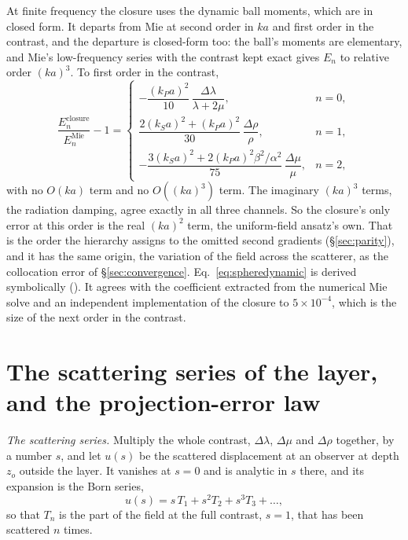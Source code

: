 \documentclass[preprint,review,12pt]{elsarticle}
\begin{document}
At finite frequency the closure uses the dynamic ball moments, which are in closed form. It
departs from Mie at second order in $ka$ and first order in the contrast, and the departure is
closed-form too: the ball's moments are elementary, and Mie's low-frequency series with the
contrast kept exact gives $E_n$ to relative order $(ka)^3$. To first order in the contrast,
\begin{equation}\label{eq:spheredynamic}
\frac{E_n^{\text{closure}}}{E_n^{\text{Mie}}}-1=
\begin{cases}
  -\dfrac{(k_Pa)^2}{10}\,\dfrac{\Delta\lambda}{\lambda+2\mu}, & n=0,\\[8pt]
  \dfrac{2(k_Sa)^2+(k_Pa)^2}{30}\,\dfrac{\Delta\rho}{\rho}, & n=1,\\[8pt]
  -\dfrac{3(k_Sa)^2+2(k_Pa)^2\beta^2/\alpha^2}{75}\,\dfrac{\Delta\mu}{\mu}, & n=2,
\end{cases}
\end{equation}
with no $O(ka)$ term and no $O((ka)^3)$ term. The imaginary $(ka)^3$ terms, the radiation damping,
agree exactly in all three channels. So the closure's only error at this order is the real
$(ka)^2$ term, the uniform-field ansatz's own. That is the order the hierarchy assigns to the
omitted second gradients (\S\ref{sec:parity}), and it has the same origin, the variation of the
field across the scatterer, as the collocation error of \S\ref{sec:convergence}. Eq.~\eqref{eq:spheredynamic} is derived symbolically
(). It agrees with the coefficient extracted from the numerical Mie
solve and an independent implementation of the closure to $5\times10^{-4}$, which is the size of the
next order in the contrast.

\FloatBarrier

\section{The scattering series of the layer, and the projection-error law}\label{app:borndefect}

\emph{The scattering series.} Multiply the whole contrast, $\Delta\lambda$, $\Delta\mu$ and
$\Delta\rho$ together, by a number $s$, and let $u(s)$ be the scattered displacement at an observer at
depth $z_o$ outside the layer. It vanishes at $s=0$ and is analytic in $s$ there, and its expansion is
the Born series,
\begin{equation}\label{eq:bornseries}
  u(s)=s\,T_1+s^2T_2+s^3T_3+\dots,
\end{equation}
so that $T_n$ is the part of the field at the full contrast, $s=1$, that has been scattered $n$ times.
\end{document}
